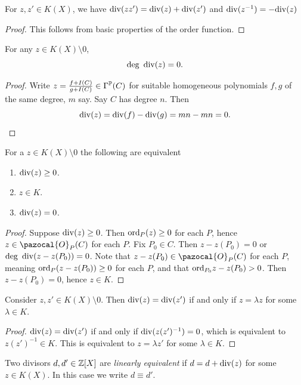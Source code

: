     \begin{lemma}
        For $z,z'\in K(X)$, we have $\mathrm{div}(zz')=\mathrm{div}(z)+\mathrm{div}(z')$ and $\mathrm{div}(z^{-1})=-\mathrm{div}(z)$
    \end{lemma}
    \begin{proof}
        This follows from basic properties of the order function.
    \end{proof}
    \begin{lemma}
        For any $z\in K(X)\setminus 0$,
        $$
            \deg \ \mathrm{div}(z) = 0.
        $$
    \end{lemma}
    \begin{proof}
        Write $z = \frac{f+I(C)}{g+I(C)}\in \Gamma^{\mathbb{P}}(C)$ for suitable homogeneous polynomials $f,g$ of the same degree, $m$ say. Say $C$ has degree $n$. Then 
        $$
            \mathrm{div}(z)=\mathrm{div}(f)-\mathrm{div}(g)= mn -mn =0.
        $$
    \end{proof}
    \begin{corollary}\label{DivisorOfRationalFunctionIsZeroIffInBaseField}
        For a $z\in K(X)\setminus 0$ the following are equivalent
        \begin{enumerate}
            \item $\mathrm{div}(z)\geq 0$.
            \item $z\in K$.
            \item $\mathrm{div}(z) = 0$. 
        \end{enumerate}
    \end{corollary}
    \begin{proof}
        Suppose $\mathrm{div}(z) \geq 0$. Then $\mathrm{ord}_P(z)\geq 0$ for each $P$, hence $z\in \pazocal{O}_P(C)$ for each $P$. Fix $P_0\in C$. Then $z-z(P_0) = 0$ or $\deg\ \mathrm{div}(z-z(P_0))=0$. Note that $z-z(P_0)\in \pazocal{O}_P(C)$ for each $P$, meaning $\mathrm{ord}_P(z-z(P_0))\geq 0$ for each $P$, and that $\mathrm{ord}_{P_0}{z-z(P_0)}>0$. Then $z-z(P_0)=0$, hence $z\in K$. 
    \end{proof}
    \begin{corollary}
        Consider $z,z'\in K(X)\setminus 0$. Then $\mathrm{div}(z)=\mathrm{div}(z')$ if and only if $z=\lambda z$ for some $\lambda\in K$. 
    \end{corollary}
    \begin{proof}
        $\mathrm{div}(z)=\mathrm{div}(z')$ if and only if $\mathrm{div}(z(z')^{-1})=0$, which is equivalent to $z(z')^{-1}\in K$. This is equivalent to $z=\lambda z'$ for some $\lambda \in K$. 
    \end{proof}
    \begin{definition}
        Two divisors $d,d'\in \mathbb{Z}[X]$ are \emph{linearly equivalent} if $d=d+\mathrm{div}(z)$ for some $z\in K(X)$. In this case we write $d\equiv d'$.
    \end{definition}
